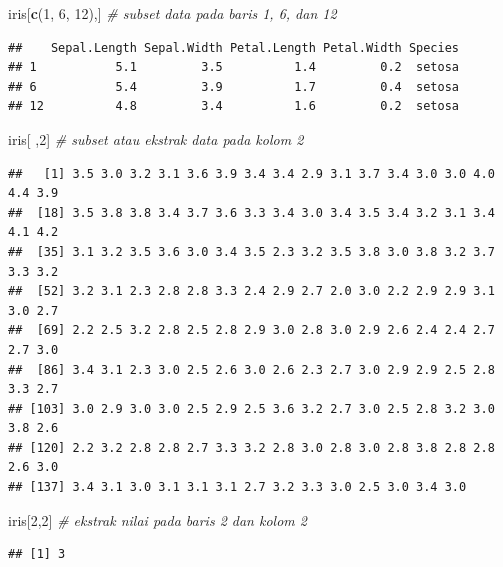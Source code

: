 \documentclass[]{article}
\newenvironment{Shaded}{\begin{snugshade}}{\end{snugshade}}
\newcommand{\KeywordTok}[1]{\textcolor[rgb]{0.13,0.29,0.53}{\textbf{#1}}}
\newcommand{\DecValTok}[1]{\textcolor[rgb]{0.00,0.00,0.81}{#1}}
\newcommand{\CommentTok}[1]{\textcolor[rgb]{0.56,0.35,0.01}{\textit{#1}}}
\newcommand{\NormalTok}[1]{#1}
\begin{document}
\begin{Shaded}
\begin{Highlighting}[]
\NormalTok{iris[}\KeywordTok{c}\NormalTok{(}\DecValTok{1}\NormalTok{, }\DecValTok{6}\NormalTok{, }\DecValTok{12}\NormalTok{),] }\CommentTok{# subset data pada baris 1, 6, dan 12}
\end{Highlighting}
\end{Shaded}

\begin{verbatim}
##    Sepal.Length Sepal.Width Petal.Length Petal.Width Species
## 1           5.1         3.5          1.4         0.2  setosa
## 6           5.4         3.9          1.7         0.4  setosa
## 12          4.8         3.4          1.6         0.2  setosa
\end{verbatim}

\begin{Shaded}
\begin{Highlighting}[]
\NormalTok{iris[ ,}\DecValTok{2}\NormalTok{] }\CommentTok{# subset atau ekstrak data pada kolom 2}
\end{Highlighting}
\end{Shaded}

\begin{verbatim}
##   [1] 3.5 3.0 3.2 3.1 3.6 3.9 3.4 3.4 2.9 3.1 3.7 3.4 3.0 3.0 4.0 4.4 3.9
##  [18] 3.5 3.8 3.8 3.4 3.7 3.6 3.3 3.4 3.0 3.4 3.5 3.4 3.2 3.1 3.4 4.1 4.2
##  [35] 3.1 3.2 3.5 3.6 3.0 3.4 3.5 2.3 3.2 3.5 3.8 3.0 3.8 3.2 3.7 3.3 3.2
##  [52] 3.2 3.1 2.3 2.8 2.8 3.3 2.4 2.9 2.7 2.0 3.0 2.2 2.9 2.9 3.1 3.0 2.7
##  [69] 2.2 2.5 3.2 2.8 2.5 2.8 2.9 3.0 2.8 3.0 2.9 2.6 2.4 2.4 2.7 2.7 3.0
##  [86] 3.4 3.1 2.3 3.0 2.5 2.6 3.0 2.6 2.3 2.7 3.0 2.9 2.9 2.5 2.8 3.3 2.7
## [103] 3.0 2.9 3.0 3.0 2.5 2.9 2.5 3.6 3.2 2.7 3.0 2.5 2.8 3.2 3.0 3.8 2.6
## [120] 2.2 3.2 2.8 2.8 2.7 3.3 3.2 2.8 3.0 2.8 3.0 2.8 3.8 2.8 2.8 2.6 3.0
## [137] 3.4 3.1 3.0 3.1 3.1 3.1 2.7 3.2 3.3 3.0 2.5 3.0 3.4 3.0
\end{verbatim}

\begin{Shaded}
\begin{Highlighting}[]
\NormalTok{iris[}\DecValTok{2}\NormalTok{,}\DecValTok{2}\NormalTok{] }\CommentTok{# ekstrak nilai pada baris 2 dan kolom 2}
\end{Highlighting}
\end{Shaded}

\begin{verbatim}
## [1] 3
\end{verbatim}
\end{document}
